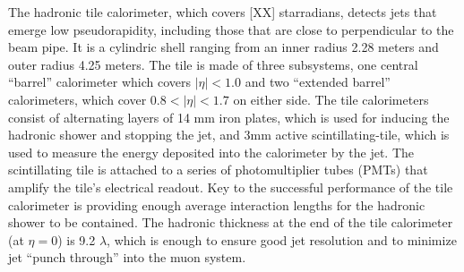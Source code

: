 

The hadronic tile calorimeter, which covers [XX] starradians, detects jets that emerge low pseudorapidity, including those that are close to perpendicular to the beam pipe.
It is a cylindric shell ranging from an inner radius 2.28 meters and outer radius 4.25 meters.
The tile is made of three subsystems, one central ``barrel'' calorimeter which covers $|\eta| < 1.0$ and two ``extended barrel'' calorimeters, which cover $0.8 < |\eta| < 1.7$ on either side.
The tile calorimeters consist of alternating layers of 14 mm iron plates, which is used for inducing the hadronic shower and stopping the jet, and 3mm active scintillating-tile, which is used to measure the energy deposited into the calorimeter by the jet.
The scintillating tile is attached to a series of photomultiplier tubes (PMTs) that amplify the tile's electrical readout.
Key to the successful performance of the tile calorimeter is providing enough average interaction lengths for the hadronic shower to be contained.
The hadronic thickness at the end of the tile calorimeter (at $\eta=0$) is 9.2 $\lambda$, which is enough to ensure good jet resolution and to minimize jet ``punch through'' into the muon system.


